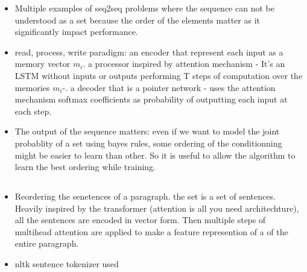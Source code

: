 \documentclass{article}
\begin{document}
\begin{itemize}
\item Multiple examples of seq2seq problems where the sequence can not be understood as a set because the order of the elements matter as it significantly impact performance.

\item read, process, write paradigm: an encoder that represent each input as a memory vector $m_i$. a processor inspired by attention mechanism - It's an LSTM without inputs or outputs performing T steps of computation over the memories $m_i$-. a decoder that is a pointer network - uses the attention mechanism softmax coefficients as probability of outputting each input at each step.

\item The output of the sequence matters: even if we want to model the joint probablity of a set using bayes rules, some ordering of the conditionning might be easier to learn than other. So it is useful to allow the algorithm to learn the best ordering while training. 
\end{itemize}

\subsection{\cite{cui2018deep: Deep Attentive Sentence Ordering Network}}

\begin{itemize}

\item Reordering the senetences of a paragraph. the set is a set of sentences. Heavily inspired by the transformer (attention is all you need architechture), all the sentences are encoded in vector form. Then multiple steps of multihead attention are applied to make a feature represention of a of the entire paragraph. 
\item nltk sentence tokenizer used

\end{itemize}

 

\end{document}
